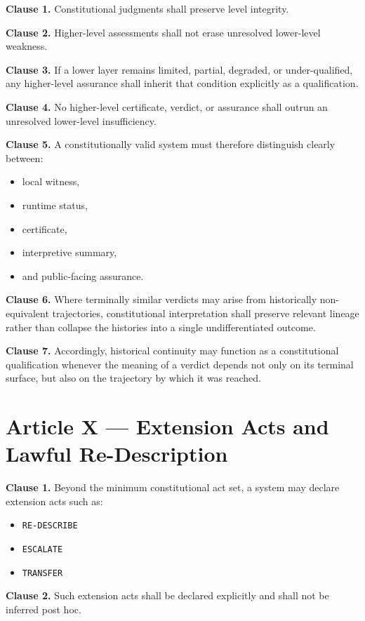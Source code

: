 \documentclass[11pt]{article}
\begin{document}
\textbf{Clause 1.} Constitutional judgments shall preserve level integrity.

\textbf{Clause 2.} Higher-level assessments shall not erase unresolved lower-level weakness.

\textbf{Clause 3.} If a lower layer remains limited, partial, degraded, or under-qualified, any higher-level assurance shall inherit that condition explicitly as a qualification.

\textbf{Clause 4.} No higher-level certificate, verdict, or assurance shall outrun an unresolved lower-level insufficiency.

\textbf{Clause 5.} A constitutionally valid system must therefore distinguish clearly between:
\begin{itemize}[leftmargin=2em]
    \item local witness,
    \item runtime status,
    \item certificate,
    \item interpretive summary,
    \item and public-facing assurance.
\end{itemize}

\textbf{Clause 6.} Where terminally similar verdicts may arise from historically non-equivalent trajectories, constitutional interpretation shall preserve relevant lineage rather than collapse the histories into a single undifferentiated outcome.

\textbf{Clause 7.} Accordingly, historical continuity may function as a constitutional qualification whenever the meaning of a verdict depends not only on its terminal surface, but also on the trajectory by which it was reached.

\section*{Article X --- Extension Acts and Lawful Re-Description}

\textbf{Clause 1.} Beyond the minimum constitutional act set, a system may declare extension acts such as:
\begin{itemize}[leftmargin=2em]
    \item \texttt{RE-DESCRIBE}
    \item \texttt{ESCALATE}
    \item \texttt{TRANSFER}
\end{itemize}

\textbf{Clause 2.} Such extension acts shall be declared explicitly and shall not be inferred post hoc.
\end{document}
